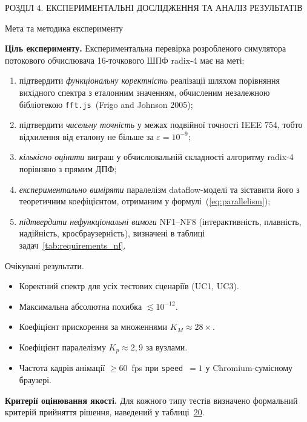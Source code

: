 \protect{}\label{_Toc229681164}{}РОЗДІЛ 4. ЕКСПЕРИМЕНТАЛЬНІ
ДОСЛІДЖЕННЯ ТА АНАЛІЗ РЕЗУЛЬТАТІВ

\protect{}\label{_Toc229681165}{}Мета та методика
експерименту

\textbf{Ціль експерименту.} Експериментальна перевірка розробленого
симулятора потокового обчислювача 16-точкового ШПФ radix-4 має на меті:

\begin{enumerate}
\def\labelenumi{\arabic{enumi}.}
\item
  підтвердити \emph{функціональну коректність} реалізації шляхом
  порівняння вихідного спектра з еталонним значенням, обчисленим
  незалежною бібліотекою \texttt{fft.js}~(Frigo and Johnson 2005);
\item
  підтвердити \emph{чисельну точність} у межах подвійної точності IEEE
  754, тобто відхилення від еталону не більше за
  \(\varepsilon = 10^{- 9}\);
\item
  \emph{кількісно оцінити} виграш у обчислювальній складності алгоритму
  radix-4 порівняно з прямим ДПФ;
\item
  \emph{експериментально виміряти} паралелізм dataflow-моделі та
  зіставити його з теоретичним коефіцієнтом, отриманим у
  формулі~(\hyperref[eq:parallelism]{{[}eq:parallelism{]}});
\item
  \emph{підтвердити нефункціональні вимоги} NF1--NF8 (інтерактивність,
  плавність, надійність, кросбраузерність), визначені в таблиці
  задач~\hyperref[tab:requirements_nf]{{[}tab:requirements\_nf{]}}.
\end{enumerate}

Очікувані результати.

\begin{itemize}
\item
  Коректний спектр для усіх тестових сценаріїв (UC1, UC3).
\item
  Максимальна абсолютна похибка \(\lesssim 10^{- 12}\).
\item
  Коефіцієнт прискорення за множеннями \(K_{M} \approx 28 \times\).
\item
  Коефіцієнт паралелізму \(K_{p} \approx 2,9\) за вузлами.
\item
  Частота кадрів анімації \(\geq 60\)~fps при \texttt{speed}~\(= 1\) у
  Chromium-сумісному браузері.
\end{itemize}

\textbf{Критерії оцінювання якості.} Для кожного типу тестів визначено
формальний критерій прийняття рішення, наведений у
таблиці~\hyperref[tab:acceptance_criteria]{20}.

